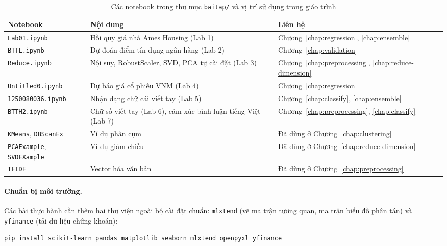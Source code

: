 \begin{table}[H]
\centering
\begin{tabular}{|l|p{5.6cm}|p{4.2cm}|}
\hline
\textbf{Notebook} & \textbf{Nội dung} & \textbf{Liên hệ} \\
\hline
\texttt{Lab01.ipynb} & Hồi quy giá nhà Ames Housing (Lab 1) & Chương~\ref{chap:regression}, \ref{chap:ensemble} \\ \hline
\texttt{BTTL.ipynb} & Dự đoán điểm tín dụng ngân hàng (Lab 2) & Chương~\ref{chap:validation} \\ \hline
\texttt{Reduce.ipynb} & Nội suy, RobustScaler, SVD, PCA tự cài đặt (Lab 3) & Chương~\ref{chap:preprocessing}, \ref{chap:reduce-dimension} \\ \hline
\texttt{Untitled0.ipynb} & Dự báo giá cổ phiếu VNM (Lab 4) & Chương~\ref{chap:regression} \\ \hline
\texttt{1250080036.ipynb} & Nhận dạng chữ cái viết tay (Lab 5) & Chương~\ref{chap:classify}, \ref{chap:ensemble} \\ \hline
\texttt{BTTH2.ipynb} & Chữ số viết tay (Lab 6), cảm xúc bình luận tiếng Việt (Lab 7) & Chương~\ref{chap:preprocessing}, \ref{chap:classify} \\ \hline
\texttt{KMeans}, \texttt{DBScanEx} & Ví dụ phân cụm & Đã dùng ở Chương~\ref{chap:clustering} \\ \hline
\texttt{PCAExample}, \texttt{SVDEXample} & Ví dụ giảm chiều & Đã dùng ở Chương~\ref{chap:reduce-dimension} \\ \hline
\texttt{TFIDF} & Vector hóa văn bản & Đã dùng ở Chương~\ref{chap:preprocessing} \\ \hline
\end{tabular}
\caption{Các notebook trong thư mục \texttt{baitap/} và vị trí sử dụng trong giáo trình}
\end{table}

\paragraph{Chuẩn bị môi trường.} Các bài thực hành cần thêm hai thư viện ngoài bộ cài đặt chuẩn: \texttt{mlxtend} (vẽ ma trận tương quan, ma trận biểu đồ phân tán) và \texttt{yfinance} (tải dữ liệu chứng khoán):
\begin{lstlisting}[language=bash, caption={Cài đặt thư viện cho các bài thực hành}]
pip install scikit-learn pandas matplotlib seaborn mlxtend openpyxl yfinance
\end{lstlisting}

